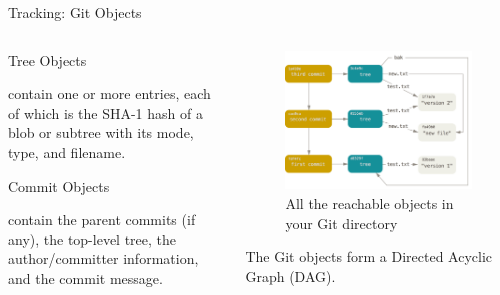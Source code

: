 \begin{frame}[fragile]{Tracking: Git Objects}
  \begin{columns}
    \begin{column}{0.3\textwidth}
      Tree Objects
      \begin{flushleft}
        \footnotesize
contain one or more entries, each of which is the SHA-1 hash of a blob or
subtree with its mode, type, and filename. 
      \end{flushleft}
      Commit Objects
      \begin{flushleft}
        \footnotesize
contain the parent commits (if any), the top-level tree, the author/committer
information, and the commit message.
      \end{flushleft}
    \end{column}
    \begin{column}{0.7\textwidth}
      \begin{figure}
        \includegraphics[width=\textwidth]{tracking/data-model-3}
        \caption{All the reachable objects in your Git directory}
      \end{figure}
      \begin{flushleft}
        \footnotesize
        The Git objects form a Directed Acyclic Graph (DAG).
      \end{flushleft}
    \end{column}
  \end{columns}
\end{frame}
